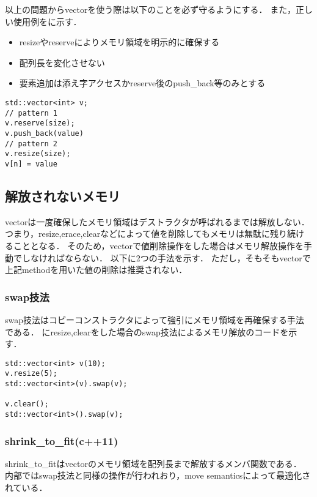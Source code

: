 以上の問題からvectorを使う際は以下のことを必ず守るようにする．
また，正しい使用例をに示す．
\begin{itemize}
    \item resizeやreserveによりメモリ領域を明示的に確保する
    \item 配列長を変化させない
    \item 要素追加は添え字アクセスかreserve後のpush\_back等のみとする
\end{itemize}

\begin{lstlisting}[label=cd:vector_reserve,caption=Correct addition method]
std::vector<int> v;
// pattern 1
v.reserve(size);
v.push_back(value)
// pattern 2
v.resize(size);
v[n] = value
\end{lstlisting}

\subsection{解放されないメモリ}
vectorは一度確保したメモリ領域はデストラクタが呼ばれるまでは解放しない．
つまり，resize,erace,clearなどによって値を削除してもメモリは無駄に残り続けることとなる．
そのため，vectorで値削除操作をした場合はメモリ解放操作を手動でしなければならない．
以下に2つの手法を示す．
ただし，そもそもvectorで上記methodを用いた値の削除は推奨されない．

\subsubsection{swap技法}
swap技法はコピーコンストラクタによって強引にメモリ領域を再確保する手法である．
にresize,clearをした場合のswap技法によるメモリ解放のコードを示す．
\begin{lstlisting}[label=cd:vector_swap,caption=swap method]
std::vector<int> v(10);
v.resize(5);
std::vector<int>(v).swap(v);

v.clear();
std::vector<int>().swap(v);
\end{lstlisting}

\subsubsection{shrink\_to\_fit(c++11)}
shrink\_to\_fitはvectorのメモリ領域を配列長まで解放するメンバ関数である．
内部ではswap技法と同様の操作が行われおり，move semanticsによって最適化されている．

